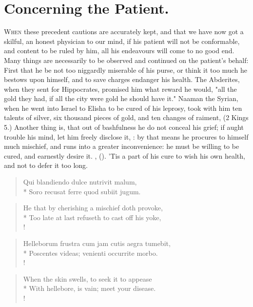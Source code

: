 {%
\section{Concerning the Patient.}


\lettrine{W}{hen} these precedent cautions are accurately kept, and that we have now got a skilful, an honest physician to our mind, if his patient will not be conformable, and content to be ruled by him, all his endeavours will come to no good end. Many things are necessarily to be observed and continued on the patient's behalf: First that he be not too niggardly miserable of his purse, or think it too much he bestows upon himself, and to save charges endanger his health. The Abderites, when they sent for Hippocrates, promised him what reward he would, "all the gold they had, if all the city were gold he should have it." Naaman the Syrian, when he went into Israel to Elisha to be cured of his leprosy, took with him ten talents of silver, six thousand pieces of gold, and ten changes of raiment, (2 Kings  5.) Another thing is, that out of bashfulness he do not conceal his grief; if aught trouble his mind, let him freely disclose it, : by that means he procures to himself much mischief, and runs into a greater inconvenience: he must be willing to be cured, and earnestly desire it. , (\Seneca). 'Tis a part of his cure to wish his own health, and not to defer it too long.

\begin{latin}
\begin{verse}%
Qui blandiendo dulce nutrivit malum,\\*
Soro recusat ferre quod subiit jugum.
\end{verse}%
\end{latin}

\begin{verse}%
He that by cherishing a mischief doth provoke,\\*
Too late at last refuseth to cast off his yoke,\\!
\end{verse}%

\begin{latin}
\begin{verse}%
Helleborum frustra cum jam cutis aegra tumebit,\\*
Poscentes videas; venienti occurrite morbo.\\!
\end{verse}%
\end{latin}
\translationrule%
\begin{verse}%
When the skin swells, to seek it to appease\\*
With hellebore, is vain; meet your disease.\\!
\end{verse}%

}
